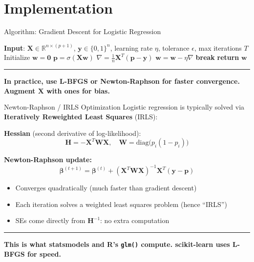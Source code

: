 \documentclass[8pt,aspectratio=169]{beamer}
\newcommand{\bottomnote}[1]{%
\vfill
\vspace{-2mm}
\textcolor{mllavender2}{\rule{\textwidth}{0.4pt}}
\vspace{1mm}
\footnotesize
\textbf{#1}
}
\begin{document}
\section{Implementation}

\begin{frame}[t]{Algorithm: Gradient Descent for Logistic Regression}
\begin{algorithmic}[1]
\STATE \textbf{Input}: $\mathbf{X} \in \mathbb{R}^{n \times (p+1)}$, $\mathbf{y} \in \{0,1\}^n$, learning rate $\eta$, tolerance $\epsilon$, max iterations $T$
\STATE Initialize $\mathbf{w} = \mathbf{0}$
\STATE $\mathbf{p} = \sigma(\mathbf{X}\mathbf{w})$
\STATE $\nabla = \frac{1}{n}\mathbf{X}^T(\mathbf{p} - \mathbf{y})$
\STATE $\mathbf{w} = \mathbf{w} - \eta \nabla$
\IF{$\|\nabla\| < \epsilon$}
\STATE \textbf{break}
\ENDIF
\ENDFOR
\STATE \textbf{return} $\mathbf{w}$
\end{algorithmic}
\bottomnote{In practice, use L-BFGS or Newton-Raphson for faster convergence. Augment $\mathbf{X}$ with ones for bias.}
\end{frame}

\begin{frame}[t]{Newton-Raphson / IRLS Optimization}
Logistic regression is typically solved via \textbf{Iteratively Reweighted Least Squares} (IRLS):

\textbf{Hessian} (second derivative of log-likelihood):
\begin{equation}
  \mathbf{H} = -\mathbf{X}^T\mathbf{W}\mathbf{X}, \quad \mathbf{W} = \text{diag}\bigl(p_i(1-p_i)\bigr)
\end{equation}

\textbf{Newton-Raphson update:}
\begin{equation}
  \boldsymbol{\beta}^{(t+1)} = \boldsymbol{\beta}^{(t)} + (\mathbf{X}^T\mathbf{W}\mathbf{X})^{-1}\mathbf{X}^T(\mathbf{y} - \mathbf{p})
\end{equation}

\begin{itemize}
\item Converges quadratically (much faster than gradient descent)
\item Each iteration solves a weighted least squares problem (hence ``IRLS'')
\item SEs come directly from $\mathbf{H}^{-1}$: no extra computation
\end{itemize}
\bottomnote{This is what statsmodels and R's \texttt{glm()} compute. scikit-learn uses L-BFGS for speed.}
\end{frame}
\end{document}
